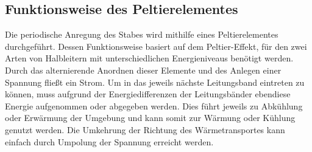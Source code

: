 \subsection{Funktionsweise des Peltierelementes}
Die periodische Anregung des Stabes wird mithilfe eines Peltierelementes durchgeführt.
Dessen Funktionsweise basiert auf dem Peltier-Effekt, für den zwei Arten von Halbleitern mit unterschiedlichen Energieniveaus benötigt werden.
Durch das alternierende Anordnen dieser Elemente und des Anlegen einer Spannung fließt ein Strom.
Um in das jeweils nächste Leitungsband eintreten zu können, muss aufgrund der Energiedifferenzen der Leitungsbänder ebendiese Energie aufgenommen oder abgegeben werden.
Dies führt jeweils zu Abkühlung oder Erwärmung der Umgebung und kann somit zur Wärmung oder Kühlung genutzt werden.
Die Umkehrung der Richtung des Wärmetransportes kann einfach durch Umpolung der Spannung erreicht werden.

\label{sec:Theorie}


